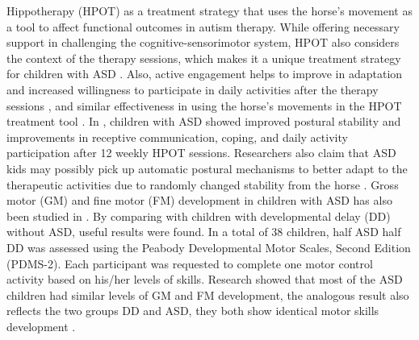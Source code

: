 Hippotherapy (HPOT) \cite{ajzenman2013effect} as a treatment strategy that uses the 
horse's movement as a tool to affect functional outcomes in autism therapy. While
offering necessary support in challenging the cognitive-sensorimotor system, HPOT 
also considers the context of the therapy sessions, which makes it a unique treatment
strategy for children with ASD \cite{engel2007enhancing}. Also, active engagement 
helps to improve in adaptation and increased willingness to participate in daily
activities after the therapy sessions \cite{brown2010relationship}, and similar 
effectiveness in using the horse's movements in the HPOT treatment tool \cite{ajzenman2013effect}. 
In \cite{ajzenman2013effect}, children with ASD showed improved postural stability and 
improvements in receptive communication, coping, and daily activity participation after 
12 weekly HPOT sessions. Researchers also claim that ASD kids may possibly pick up 
automatic postural mechanisms to better adapt to the therapeutic activities due to 
randomly changed stability from the horse \cite{ajzenman2013effect}. Gross motor (GM) 
and fine motor (FM) development in children with ASD has also been studied in \cite{provost2007levels}. 
By comparing with children with developmental delay (DD) without ASD, useful results
were found. In a total of 38 children, half ASD half DD was assessed using the Peabody
Developmental Motor Scales, Second Edition (PDMS-2). Each participant was requested to 
complete one motor control activity based on his/her levels of skills. Research showed
that most of the ASD children had similar levels of GM and FM development, the analogous
result also reflects the two groups DD and ASD, they both show identical motor skills
development \cite{provost2007levels}.\\

